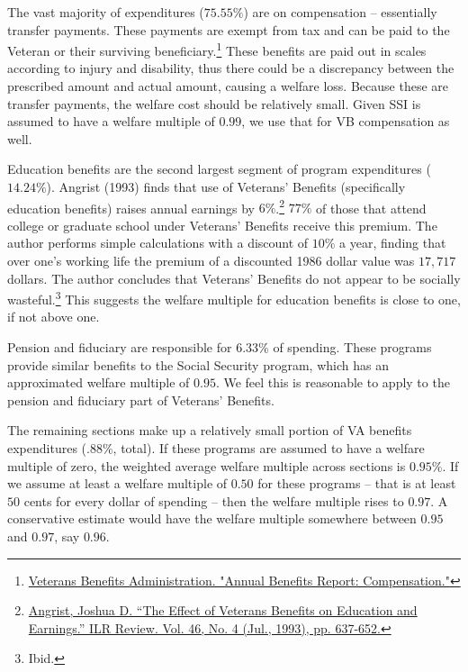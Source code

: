 \documentclass{article}
\begin{document}
The vast majority of expenditures ($75.55\%$) are on compensation -- essentially transfer payments. These payments are exempt from tax and can be paid to the Veteran or their surviving beneficiary.\footnote{\href{http://www.benefits.va.gov/REPORTS/abr/ABR-Compensation-FY14-10202015.pdf}{Veterans Benefits Administration. "Annual Benefits Report: Compensation."}} These benefits are paid out in scales according to injury and disability, thus there could be a discrepancy between the prescribed amount and actual amount, causing a welfare loss. Because these are transfer payments, the welfare cost should be relatively small. Given SSI is assumed to have a welfare multiple of $0.99$, we use that for VB compensation as well.

Education benefits are the second largest segment of program expenditures ($14.24\%$). Angrist (1993) finds that use of Veterans' Benefits (specifically education benefits) raises annual earnings by $6\%$.\footnote{\href{http://www.jstor.org/stable/2524309}{Angrist, Joshua D. “The Effect of Veterans Benefits on Education and Earnings.” ILR Review. Vol. 46, No. 4 (Jul., 1993), pp. 637-652.}} $77\%$ of those that attend college or graduate school under Veterans' Benefits receive this premium. The author performs simple calculations with a discount of $10\%$ a year, finding that over one's working life the premium of a discounted 1986 dollar value was $17,717$ dollars. The author concludes that Veterans' Benefits do not appear to be socially wasteful.\footnote{Ibid.} This suggests the welfare multiple for education benefits is close to one, if not above one.

Pension and fiduciary are responsible for $6.33\%$ of spending. These programs provide similar benefits to the Social Security program, which has an approximated welfare multiple of $0.95$. We feel this is reasonable to apply to the pension and fiduciary part of Veterans' Benefits.

The remaining sections make up a relatively small portion of VA benefits expenditures ($.88\%$, total). If these programs are assumed to have a welfare multiple of zero, the weighted average welfare multiple across sections is $0.95\%$. If we assume at least a welfare multiple of $0.50$ for these programs -- that is at least $50$ cents for every dollar of spending -- then the welfare multiple rises to $0.97$. A conservative estimate would have the welfare multiple somewhere between $0.95$ and $0.97$, say $0.96$.
\end{document}
